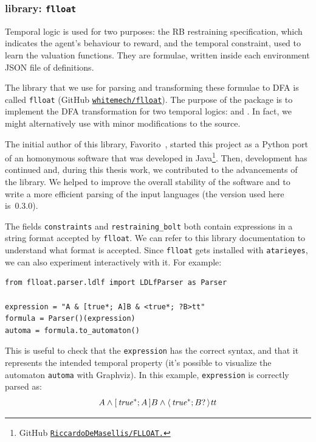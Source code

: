 \subsubsection*{\ldl{} library: \texttt{flloat}}

Temporal logic is used for two purposes: the RB restraining specification,
which indicates the agent's behaviour to reward, and the temporal constraint,
used to learn the valuation functions. They are \ldl{} formulae, written
inside each environment JSON file of definitions.

The library that we use for parsing and transforming these formulae to DFA is
called \texttt{flloat} (GitHub \href{https://github.com/whitemech/flloat}{%
\texttt{whitemech/flloat}}). The purpose of the package is to
implement the DFA transformation for two temporal logics: \ltl{} and \ldl{}.
In fact, we might alternatively use \ltl{} with minor modifications to the
source.

The initial author of this library, Favorito~\cite{bib:favorito-thesis},
started this project as a Python port of an homonymous software that was
developed in Java\footnote{GitHub
\href{https://github.com/RiccardoDeMasellis/FLLOAT}{%
\texttt{RiccardoDeMasellis/FLLOAT.}}}. Then, development has continued and,
during this thesis work, we contributed to the advancements of the
library. We helped to improve the overall stability of the software and to
write a more efficient parsing of the input languages (the version used here
is~0.3.0).

The fields \verb|constraints| and \verb|restraining_bolt| both contain \ldl{}
expressions in a string format accepted by \texttt{flloat}.  We can refer to
this library documentation to understand what format is accepted. Since
\texttt{flloat} gets installed with \texttt{atarieyes}, we can also experiment
interactively with it.  For example:
\begin{verbatim}
from flloat.parser.ldlf import LDLfParser as Parser

expression = "A & [true*; A]B & <true*; ?B>tt"
formula = Parser()(expression)
automa = formula.to_automaton()
\end{verbatim}
This is useful to check that the \texttt{expression} has the correct syntax,
and that it represents the intended temporal property (it's possible to
visualize the automaton \texttt{automa} with Graphviz). In this example,
\texttt{expression} is correctly parsed as:
\[
	A \land [\, {\text{\textit{true}}^*; A} \,]B \land \langle\, {\text{\textit{true}}^*; B?} \,\rangle \text{\textit{tt}}
\]



